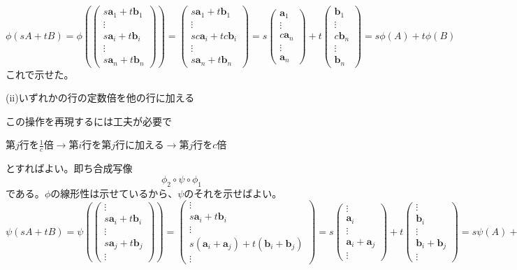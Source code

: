 \documentclass[dvipdfmx]{jsarticle}
\begin{document}
\[\phi(sA+tB)=\phi(\begin{pmatrix}s\bm{a}_1+t\bm{b}_1\\\vdots\\s\bm{a}_i+t\bm{b}_i\\\vdots\\s\bm{a}_n+t\bm{b}_n\end{pmatrix})=\begin{pmatrix}s\bm{a}_1+t\bm{b}_1\\\vdots\\sc\bm{a}_i+tc\bm{b}_i\\\vdots\\s\bm{a}_n+t\bm{b}_n\end{pmatrix}=s\begin{pmatrix}\bm{a}_1\\\vdots\\c\bm{a}_n\\\vdots\\\bm{a}_n\end{pmatrix}+t\begin{pmatrix}\bm{b}_1\\\vdots\\c\bm{b}_n\\\vdots\\\bm{b}_n\end{pmatrix}=s\phi(A)+t\phi(B)\]
これで示せた。\\\par
(ii)いずれかの行の定数倍を他の行に加える\par
この操作を再現するには工夫が必要で
\begin{center}
第$j$行を$\displaystyle\frac{1}{c}$倍$\to$第$i$行を第$j$行に加える$\to$第$j$行を$c$倍
\end{center}
とすればよい。即ち合成写像
\[\phi_2\circ\psi\circ\phi_1\]
である。$\phi$の線形性は示せているから、$\psi$のそれを示せばよい。
\[\psi(sA+tB)=\psi(\begin{pmatrix}\vdots\\s\bm{a}_i+t\bm{b}_i\\\vdots\\s\bm{a}_j+t\bm{b}_j\\\vdots\end{pmatrix})=\begin{pmatrix}\vdots\\s\bm{a}_i+t\bm{b}_i\\\vdots\\s(\bm{a}_i+\bm{a}_j)+t(\bm{b}_i+\bm{b}_j)\\\vdots\end{pmatrix}=s\begin{pmatrix}\vdots\\\bm{a}_i\\\vdots\\\bm{a}_i+\bm{a}_j\\\vdots\end{pmatrix}+t\begin{pmatrix}\vdots\\\bm{b}_i\\\vdots\\\bm{b}_i+\bm{b}_j\\\vdots\end{pmatrix}=s\psi(A)+t\psi(B)\]
\end{document}
